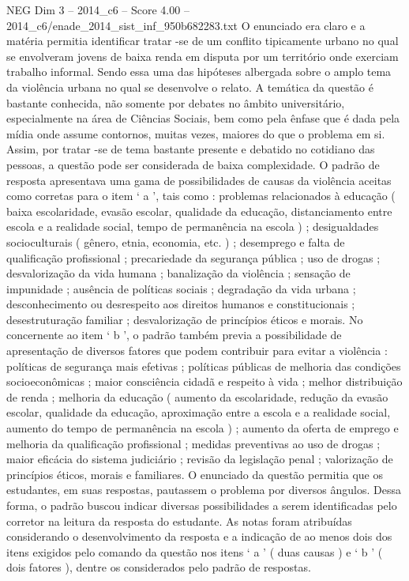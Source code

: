 \begin{textsample}{NEG Dim 3 – 2014\_c6 – Score 4.00 – 2014\_c6/enade\_2014\_sist\_inf\_950b682283.txt}
O enunciado era claro e a matéria permitia identificar tratar -se de um conflito tipicamente urbano no qual se envolveram jovens de baixa renda em disputa por um território onde exerciam trabalho informal.
Sendo essa uma das hipóteses albergada sobre o amplo tema da violência urbana no qual se desenvolve o relato.
A temática da questão é bastante conhecida, não somente por debates no âmbito universitário, especialmente na área de Ciências Sociais, bem como pela ênfase que é dada pela mídia onde assume contornos, muitas vezes, maiores do que o problema em si.
Assim, por tratar -se de tema bastante presente e debatido no cotidiano das pessoas, a questão pode ser considerada de baixa complexidade.
O padrão de resposta apresentava uma gama de possibilidades de causas da violência aceitas como corretas para o item ‘ a ’, tais como : problemas relacionados à educação ( baixa escolaridade, evasão escolar, qualidade da educação, distanciamento entre escola e a realidade social, tempo de permanência na escola ) ; desigualdades socioculturais ( gênero, etnia, economia, etc. ) ; desemprego e falta de qualificação profissional ; precariedade da segurança pública ; uso de drogas ; desvalorização da vida humana ; banalização da violência ; sensação de impunidade ; ausência de políticas sociais ; degradação da vida urbana ; desconhecimento ou desrespeito aos direitos humanos e constitucionais ; desestruturação familiar ; desvalorização de princípios éticos e morais.
No concernente ao item ‘ b ’, o padrão também previa a possibilidade de apresentação de diversos fatores que podem contribuir para evitar a violência : políticas de segurança mais efetivas ; políticas públicas de melhoria das condições socioeconômicas ; maior consciência cidadã e respeito à vida ; melhor distribuição de renda ; melhoria da educação ( aumento da escolaridade, redução da evasão escolar, qualidade da educação, aproximação entre a escola e a realidade social, aumento do tempo de permanência na escola ) ; aumento da oferta de emprego e melhoria da qualificação profissional ; medidas preventivas ao uso de drogas ; maior eficácia do sistema judiciário ; revisão da legislação penal ; valorização de princípios éticos, morais e familiares.
O enunciado da questão permitia que os estudantes, em suas respostas, pautassem o problema por diversos ângulos.
Dessa forma, o padrão buscou indicar diversas possibilidades a serem identificadas pelo corretor na leitura da resposta do estudante.
As notas foram atribuídas considerando o desenvolvimento da resposta e a indicação de ao menos dois dos itens exigidos pelo comando da questão nos itens ‘ a ’ ( duas causas ) e ‘ b ’ ( dois fatores ), dentre os considerados pelo padrão de respostas.

\end{textsample}
